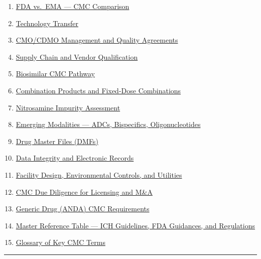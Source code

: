 \documentclass[
  11pt,
  a4paper,
]{report}
\begin{document}
\begin{enumerate}
  \protect\hyperlink{19-common-cmc-pitfalls-and-how-to-avoid-them}{Common
  CMC Pitfalls and How to Avoid Them}
\item
  \protect\hyperlink{20-fda-vs-ema--cmc-comparison}{FDA vs.~EMA --- CMC
  Comparison}
\item
  \protect\hyperlink{21-technology-transfer}{Technology Transfer}
\item
  \protect\hyperlink{22-cmocdmo-management-and-quality-agreements}{CMO/CDMO
  Management and Quality Agreements}
\item
  \protect\hyperlink{23-supply-chain-and-vendor-qualification}{Supply
  Chain and Vendor Qualification}
\item
  \protect\hyperlink{24-biosimilar-cmc-pathway}{Biosimilar CMC Pathway}
\item
  \protect\hyperlink{25-combination-products-and-fixed-dose-combinations}{Combination
  Products and Fixed-Dose Combinations}
\item
  \protect\hyperlink{26-nitrosamine-impurity-assessment}{Nitrosamine
  Impurity Assessment}
\item
  \protect\hyperlink{27-emerging-modalities--adcs-bispecifics-oligonucleotides}{Emerging
  Modalities --- ADCs, Bispecifics, Oligonucleotides}
\item
  \protect\hyperlink{28-drug-master-files-dmfs}{Drug Master Files
  (DMFs)}
\item
  \protect\hyperlink{29-data-integrity-and-electronic-records}{Data
  Integrity and Electronic Records}
\item
  \protect\hyperlink{30-facility-design-environmental-controls-and-utilities}{Facility
  Design, Environmental Controls, and Utilities}
\item
  \protect\hyperlink{31-cmc-due-diligence-for-licensing-and-ma}{CMC Due
  Diligence for Licensing and M\&A}
\item
  \protect\hyperlink{32-generic-drug-anda-cmc-requirements}{Generic Drug
  (ANDA) CMC Requirements}
\item
  \protect\hyperlink{33-master-reference-table}{Master Reference Table
  --- ICH Guidelines, FDA Guidances, and Regulations}
\item
  \protect\hyperlink{34-glossary-of-key-cmc-terms}{Glossary of Key CMC
  Terms}
\end{enumerate}

\begin{center}\rule{0.5\linewidth}{0.5pt}\end{center}
\end{document}
